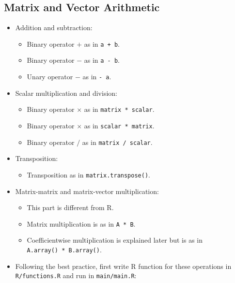 \documentclass[
]{book}
\providecommand{\tightlist}{%
  \setlength{\itemsep}{0pt}\setlength{\parskip}{0pt}}
\begin{document}
\hypertarget{matrix-and-vector-arithmetic}{%
\subsection{Matrix and Vector Arithmetic}\label{matrix-and-vector-arithmetic}}

\begin{itemize}
\tightlist
\item
  Addition and subtraction:

  \begin{itemize}
  \tightlist
  \item
    Binary operator \(+\) as in \texttt{a\ +\ b}.
  \item
    Binary operator \(-\) as in \texttt{a\ -\ b}.
  \item
    Unary operator \(-\) as in \texttt{-\ a}.
  \end{itemize}
\item
  Scalar multiplication and division:

  \begin{itemize}
  \tightlist
  \item
    Binary operator \(\times\) as in \texttt{matrix\ *\ scalar}.
  \item
    Binary operator \(\times\) as in \texttt{scalar\ *\ matrix}.
  \item
    Binary operator \(/\) as in \texttt{matrix\ /\ scalar}.
  \end{itemize}
\item
  Transposition:

  \begin{itemize}
  \tightlist
  \item
    Transposition as in \texttt{matrix.transpose()}.
  \end{itemize}
\item
  Matrix-matrix and matrix-vector multiplication:

  \begin{itemize}
  \tightlist
  \item
    This part is different from R.
  \item
    Matrix multiplication is as in \texttt{A\ *\ B}.
  \item
    Coefficientwise multiplication is explained later but is as in \texttt{A.array()\ *\ B.array()}.
  \end{itemize}
\item
  Following the best practice, first write R function for these operations in \texttt{R/functions.R} and run in \texttt{main/main.R}:
\end{itemize}
\end{document}
